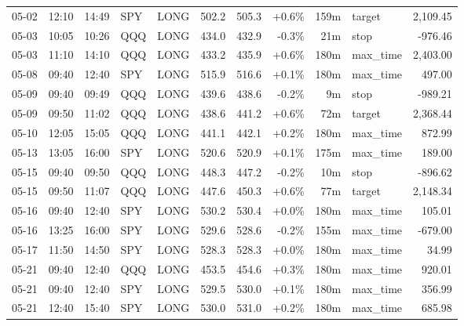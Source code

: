 \documentclass[11pt,a4paper,twoside]{article}
\begin{document}
\begin{center}
\begin{longtable}{>{\color{txtmain}}l l l l l r r r r >{\color{txtmain}}l r}
05-02 & 12:10 & 14:49 & SPY & LONG & 502.2 & 505.3 & \textcolor{wingreen}{+0.6\%} & 159m & target & \textcolor{wingreen}{2,109.45} \\
05-03 & 10:05 & 10:26 & QQQ & LONG & 434.0 & 432.9 & \textcolor{lossred}{-0.3\%} & 21m & stop & \textcolor{lossred}{-976.46} \\
05-03 & 11:10 & 14:10 & QQQ & LONG & 433.2 & 435.9 & \textcolor{wingreen}{+0.6\%} & 180m & max\_time & \textcolor{wingreen}{2,403.00} \\
05-08 & 09:40 & 12:40 & SPY & LONG & 515.9 & 516.6 & \textcolor{wingreen}{+0.1\%} & 180m & max\_time & \textcolor{wingreen}{497.00} \\
05-09 & 09:40 & 09:49 & QQQ & LONG & 439.6 & 438.6 & \textcolor{lossred}{-0.2\%} & 9m & stop & \textcolor{lossred}{-989.21} \\
05-09 & 09:50 & 11:02 & QQQ & LONG & 438.6 & 441.2 & \textcolor{wingreen}{+0.6\%} & 72m & target & \textcolor{wingreen}{2,368.44} \\
05-10 & 12:05 & 15:05 & QQQ & LONG & 441.1 & 442.1 & \textcolor{wingreen}{+0.2\%} & 180m & max\_time & \textcolor{wingreen}{872.99} \\
05-13 & 13:05 & 16:00 & SPY & LONG & 520.6 & 520.9 & \textcolor{wingreen}{+0.1\%} & 175m & max\_time & \textcolor{wingreen}{189.00} \\
05-15 & 09:40 & 09:50 & QQQ & LONG & 448.3 & 447.2 & \textcolor{lossred}{-0.2\%} & 10m & stop & \textcolor{lossred}{-896.62} \\
05-15 & 09:50 & 11:07 & QQQ & LONG & 447.6 & 450.3 & \textcolor{wingreen}{+0.6\%} & 77m & target & \textcolor{wingreen}{2,148.34} \\
05-16 & 09:40 & 12:40 & SPY & LONG & 530.2 & 530.4 & \textcolor{wingreen}{+0.0\%} & 180m & max\_time & \textcolor{wingreen}{105.01} \\
05-16 & 13:25 & 16:00 & SPY & LONG & 529.6 & 528.6 & \textcolor{lossred}{-0.2\%} & 155m & max\_time & \textcolor{lossred}{-679.00} \\
05-17 & 11:50 & 14:50 & SPY & LONG & 528.3 & 528.3 & \textcolor{wingreen}{+0.0\%} & 180m & max\_time & \textcolor{wingreen}{34.99} \\
05-21 & 09:40 & 12:40 & QQQ & LONG & 453.5 & 454.6 & \textcolor{wingreen}{+0.3\%} & 180m & max\_time & \textcolor{wingreen}{920.01} \\
05-21 & 09:40 & 12:40 & SPY & LONG & 529.5 & 530.0 & \textcolor{wingreen}{+0.1\%} & 180m & max\_time & \textcolor{wingreen}{356.99} \\
05-21 & 12:40 & 15:40 & SPY & LONG & 530.0 & 531.0 & \textcolor{wingreen}{+0.2\%} & 180m & max\_time & \textcolor{wingreen}{685.98} \\

\end{longtable}
\end{center}
\end{document}
